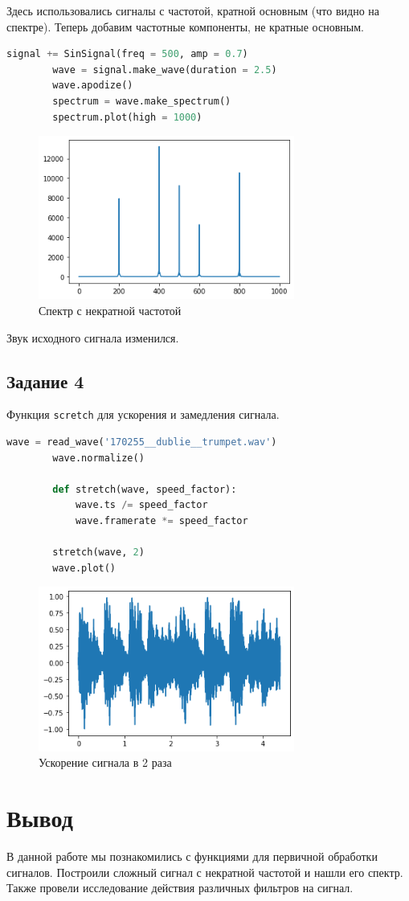 \documentclass[a4paper, 12pt]{report}
\begin{document}
	Здесь использовались сигналы с частотой, кратной основным (что видно на спектре). Теперь добавим частотные компоненты, не кратные основным.
	 \begin{lstlisting}[language=Python,caption=Добавление некратной частоты]
		signal += SinSignal(freq = 500, amp = 0.7)
		wave = signal.make_wave(duration = 2.5)
		wave.apodize()
		spectrum = wave.make_spectrum()
		spectrum.plot(high = 1000)
	\end{lstlisting}
	\begin{figure}[H]
		\centering
		\includegraphics[width=0.75\textwidth]{spectrum8.png}
		\caption{Спектр с некратной частотой}
		\label{fig:spectrum8}
	\end{figure}
	Звук исходного сигнала изменился.
	
	\section{Задание 4}
	Функция \texttt{scretch} для ускорения и замедления сигнала.
	 \begin{lstlisting}[language=Python,caption=Функция для ускорения / замедления сигнала]
		wave = read_wave('170255__dublie__trumpet.wav')
		wave.normalize()

		def stretch(wave, speed_factor):
   			wave.ts /= speed_factor
   			wave.framerate *= speed_factor

		stretch(wave, 2)
		wave.plot()
	\end{lstlisting}
	\begin{figure}[H]
		\centering
		\includegraphics[width=0.75\textwidth]{result.png}
		\caption{Ускорение сигнала в 2 раза}
		\label{fig:result}
	\end{figure}

	\chapter{Вывод}
	В данной работе мы познакомились с функциями для первичной обработки сигналов. Построили сложный сигнал с некратной частотой и нашли его спектр. Также провели исследование действия различных фильтров на сигнал.
\end{document}
